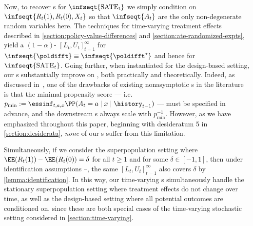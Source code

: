 \begin{remark}
  Now, to recover \cs{}s for $\infseqt{\mathrm{SATE}_t}$ we simply condition on $\infseqt{R_t(1), R_t(0), X_t}$ so that $\infseqt{A_t}$ are the only non-degenerate random variables here. The techniques for time-varying treatment effects described in \cref{section:policy-value-differences} and \cref{section:ate-randomized-expts}, yield a $(1-\alpha)$-\cs{} $[ L_t , U_t]_{t=1}^\infty$ for $\infseqt{\poldifft} \equiv \infseqt{\poldifft^\star}$ and hence for $\infseqt{\mathrm{SATE}_t}$. Going further, when instantiated for the design-based setting, our \cs{}s substantially improve on \citet[Section 4.2]{howard2018uniform}, both practically and theoretically. Indeed, as discussed in~\citet[Section 3.2]{ham2022design}, one of the drawbacks of existing nonasymptotic \cs{}s in the literature is that the minimal propensity score --- i.e. $p_\mathrm{min} := \essinf_{t,a,x} \PP(A_t = a \mid x \mid \history_{t-1})$ --- must be specified in advance, and the downstream \cs{}s always scale with $p_\mathrm{min}^{-1}$. However, as we have emphasized throughout this paper, beginning with desideratum 5 in \cref{section:desiderata}, \emph{none} of our \cs{}s suffer from this limitation.

  Simultaneously, if we consider the superpopulation setting where $\EE(R_t(1)) - \EE(R_t(0)) = \delta$ for all $t \geq 1$ and for some $\delta \in [-1, 1]$, then under identification assumptions --, the same \cs{} $[L_t, U_t]_{t=1}^\infty$ also covers $\delta$ by \cref{lemma:identification}. In this way, our time-varying \cs{}s simultaneously handle the stationary superpopulation setting where treatment effects do not change over time, as well as the design-based setting where all potential outcomes are conditioned on, since these are both special cases of the time-varying stochastic setting considered in \cref{section:time-varying}.
\end{remark}

